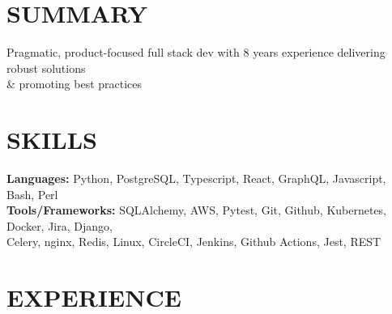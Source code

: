\documentclass[]{resume}
\begin{document}
\begin{resume}
 \setlength{\sectionskip}{1.30em}
\section{SUMMARY\makebox[387 px]{\rule[.5 ex]{387 px}{1.0pt}}}
Pragmatic, product-focused full stack dev with 8 years experience delivering robust solutions \\
\& promoting best practices
\section{SKILLS\makebox[416 px]{\rule[.5 ex]{416 px}{1.0pt}}}
\vspace{0.9mm}
\textbf{Languages:} \hspace*{13mm}Python, PostgreSQL, Typescript, React, GraphQL, Javascript, Bash, Perl \\
% 
\textbf{Tools/Frameworks:} SQLAlchemy, AWS, Pytest, Git, Github, Kubernetes, Docker, Jira, Django, \\
\hspace*{32mm}Celery, nginx, Redis, Linux, CircleCI, Jenkins, Github Actions, Jest, REST
\section{EXPERIENCE\makebox[372 px]{\rule[.5 ex]{372 px}{1.0pt}}}


\end{resume}
\end{document}
